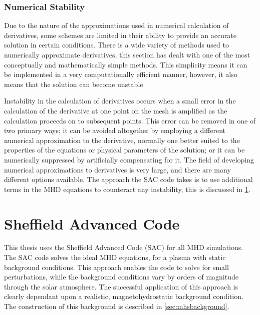 \subsubsection{Numerical Stability}

Due to the nature of the approximations used in numerical calculation of derivatives, some schemes are limited in their ability to provide an accurate solution in certain conditions.
There is a wide variety of methods used to numerically approximate derivatives, this section has dealt with one of the most conceptually and mathematically simple methods.
This simplicity means it can be implemented in a very computationally efficient manner, however, it also means that the solution can become unstable.

Instability in the calculation of derivatives occurs when a small error in the calculation of the derivative at one point on the mesh is amplified as the calculation proceeds on to subsequent points.
This error can be removed in one of two primary ways; it can be avoided altogether by employing a different numerical approximation to the derivative, normally one better suited to the properties of the equations or physical parameters of the solution; or it can be numerically suppressed by artificially compensating for it.
The field of developing numerical approximations to derivatives is very large, and there are many different options available.
The approach the SAC code takes is to use additional terms in the MHD equations to counteract any instability, this is discussed in \cref{sec:SAC}.


\section{Sheffield Advanced Code}\label{sec:SAC}

This thesis uses the Sheffield Advanced Code (SAC) \citep{shelyag2008} for all MHD simulations.
The SAC code solves the ideal MHD equations, for a plasma with static background conditions.
This approach enables the code to solve for small perturbations, while the background conditions vary by orders of magnitude through the solar atmosphere.
The successful application of this approach is clearly dependant upon a realistic, magnetohydrostatic background condition.
The construction of this background is described in \cref{sec:mhsbackground}.


